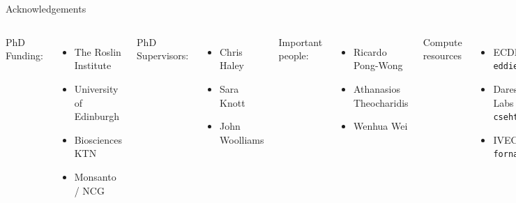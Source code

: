 \documentclass{beamer}
\begin{document}
\section*{}

\begin{frame}{Acknowledgements}


\begin{columns}[c]


{\tiny
PhD Funding:
\begin{itemize}
\item The Roslin Institute
\item University of Edinburgh
\item Biosciences KTN
\item Monsanto / NCG
\end{itemize}
PhD Supervisors:
\begin{itemize}
\item Chris Haley
\item Sara Knott
\item John Woolliams
\end{itemize}
Important people:
\begin{itemize}
\item Ricardo Pong-Wong
\item Athanasios Theocharidis
\item Wenhua Wei
\end{itemize}
Compute resources
\begin{itemize}
\item ECDF - {\tt eddie}
\item Daresbury Labs - {\tt cseht}
\item IVEC - {\tt fornax}
\end{itemize}
}


{\tiny
Complex Trait Genomics Group

\begin{itemize}
\item Peter Visscher
\item Naomi Wray
\item Joseph Powell
\item Jian Yang
\item Allan Mcrae
\item Anita Goldinger
\item Hong Lee
\item Anna Vinkhuyzen
\item Guo-Bo Chen
\item Beben Benyamin
\item Zong Zhang
\item Enda Byrne
\item Marie-Jo Brion
\item Sven Stringer
\end{itemize}
}

\end{columns}
\end{frame}
\end{document}
